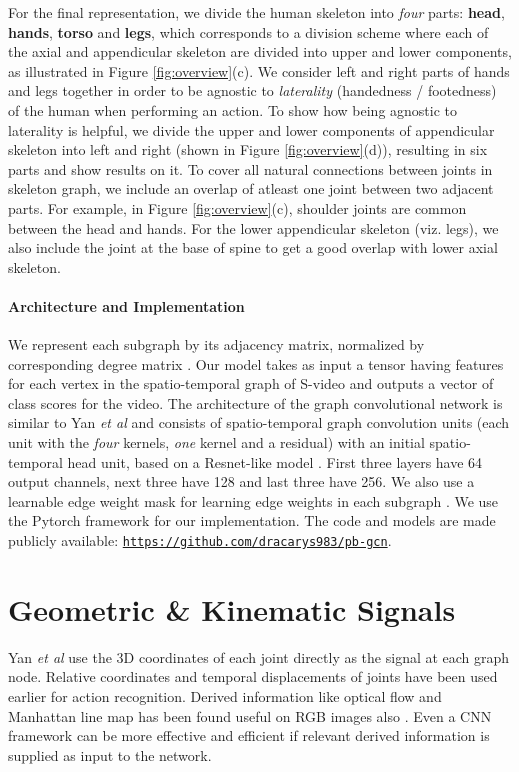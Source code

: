 \documentclass{bmvc2k}
\def\etal{\emph{et al}\bmvaOneDot}
\begin{document}
For the final representation, we divide the human skeleton into \textit{four} parts: \textbf{head}, \textbf{hands}, \textbf{torso} and \textbf{legs}, which corresponds to a division scheme where each of the axial and appendicular skeleton are divided into upper and lower components, as illustrated in Figure \ref{fig:overview}(c). We consider left and right parts of hands and legs together in order to be agnostic to \textit{laterality} \cite{lateral} (handedness / footedness) of the human when performing an action. To show how being agnostic to laterality is helpful, we divide the upper and lower components of appendicular skeleton into left and right (shown in Figure \ref{fig:overview}(d)), resulting in six parts and show results on it. To cover all natural connections between joints in skeleton graph, we include an overlap of atleast one joint between two adjacent parts. For example, in Figure \ref{fig:overview}(c), shoulder joints are common between the head and hands. For the lower appendicular skeleton (viz. legs), we also include the joint at the base of spine to get a good overlap with lower axial skeleton.

\paragraph{Architecture and Implementation} We represent each subgraph by its adjacency matrix, normalized by corresponding degree matrix . Our model takes as input a tensor having features for each vertex in the spatio-temporal graph of S-video and outputs a vector of class scores for the video. The architecture of the graph convolutional network is similar to Yan \etal \cite{yan2018spatial} and consists of  spatio-temporal graph convolution units (each unit with the \textit{four}  kernels, \textit{one}  kernel and a residual) with an initial spatio-temporal head unit, based on a Resnet-like model \cite{he2016deep}. First three layers have 64 output channels, next three have 128 and last three have 256. We also use a learnable edge weight mask for learning edge weights in each subgraph \cite{yan2018spatial}. We use the Pytorch framework \cite{paszke2017automatic} for our implementation. The code and models are made publicly available: \href{https://github.com/dracarys983/pb-gcn}{\texttt{https://github.com/dracarys983/pb-gcn}}.

\section{Geometric \& Kinematic Signals}
\label{sec:signals}
Yan \etal \cite{yan2018spatial} use the 3D coordinates of each joint directly as the signal at each graph node. Relative coordinates \cite{zhang2017geometric, ke2017new} and temporal displacements \cite{zanfir2013moving} of joints have been used earlier for action recognition. Derived information like optical flow and Manhattan line map has been found useful on RGB images also \cite{wang2016temporal,zou2018layoutnet}. Even a CNN framework can be more effective and efficient if relevant derived information is supplied as input to the network.
\end{document}
